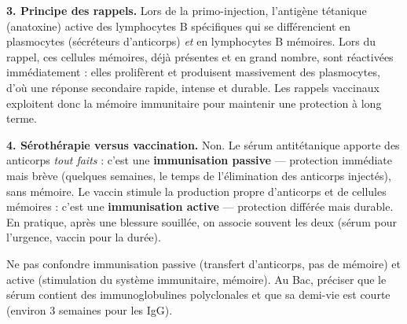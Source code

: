 \documentclass[11pt]{article}
\newcommand{\cle}[1]{{\popxbold\color{popdark}#1}}
\begin{document}
\begin{corrige}
\textbf{3. Principe des rappels.} Lors de la primo-injection, l'antigène tétanique (anatoxine) active des lymphocytes B spécifiques qui se différencient en plasmocytes (sécréteurs d'anticorps) \emph{et} en \cle{lymphocytes B mémoires}. Lors du rappel, ces cellules mémoires, déjà présentes et en grand nombre, sont réactivées immédiatement : elles prolifèrent et produisent massivement des plasmocytes, d'où une réponse secondaire rapide, intense et durable. Les rappels vaccinaux exploitent donc la \cle{mémoire immunitaire} pour maintenir une protection à long terme.

\textbf{4. Sérothérapie versus vaccination.} Non. Le sérum antitétanique apporte des anticorps \emph{tout faits} : c'est une \textbf{immunisation passive} — protection immédiate mais brève (quelques semaines, le temps de l'élimination des anticorps injectés), sans mémoire. Le vaccin stimule la production propre d'anticorps et de cellules mémoires : c'est une \textbf{immunisation active} — protection différée mais durable. En pratique, après une blessure souillée, on associe souvent les deux (sérum pour l'urgence, vaccin pour la durée).
\end{corrige}

\begin{attention}
Ne pas confondre immunisation passive (transfert d'anticorps, pas de mémoire) et active (stimulation du système immunitaire, mémoire). Au Bac, préciser que le sérum contient des immunoglobulines polyclonales et que sa demi-vie est courte (environ 3 semaines pour les IgG).
\end{attention}
\end{document}
